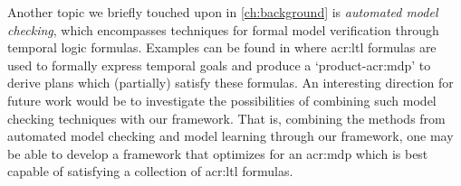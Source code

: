 Another topic we briefly touched upon in \autoref{ch:background} is \textit{automated model checking}, which encompasses techniques for formal model verification through temporal logic formulas.
Examples can be found in \cite{bhatia2010sampling, lacerda2015optimal} where \acrshort{acr:ltl} formulas are used to formally express temporal goals and produce a `product-\acrshort{acr:mdp}' to derive plans which (partially) satisfy these formulas.
An interesting direction for future work would be to investigate the possibilities of combining such model checking techniques with our framework.
That is, combining the methods from automated model checking and model learning through our framework, one may be able to develop a framework that optimizes for an \acrshort{acr:mdp} which is best capable of satisfying a collection of \acrshort{acr:ltl} formulas.




